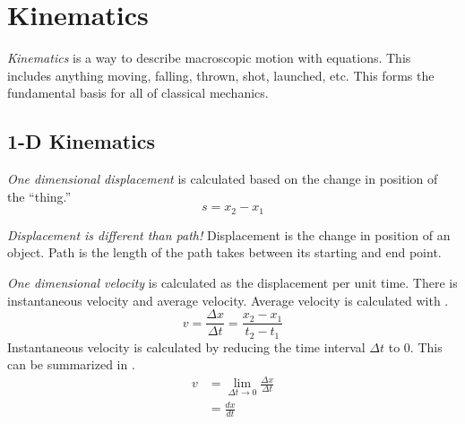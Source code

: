 \section{Kinematics}\label{sec:Kinematics}
\begin{definition}[Kinematics]\label{def:Kinematics}
  \emph{Kinematics} is a way to describe macroscopic motion with equations.
  This includes anything moving, falling, thrown, shot, launched, etc.
  This forms the fundamental basis for all of classical mechanics.
\end{definition}

\subsection{1-D Kinematics}\label{subsec:1-D Kinematics}
\begin{definition}[1-D Displacement]\label{def:1-D Displacement}
  \emph{One dimensional displacement} is calculated based on the change in position of the ``thing.''
  \begin{equation}\label{eq:1-D Displacement}
    s = x_{2} - x_{1}
  \end{equation}
  \begin{remark}
    \emph{Displacement is different than path!}
    Displacement is the change in position of an object.
    Path is the length of the path takes between its starting and end point.
  \end{remark}
\end{definition}

\begin{definition}[1-D Velocity]\label{def:1-D Velocity}
  \emph{One dimensional velocity} is calculated as the displacement per unit time.
  There is instantaneous velocity and average velocity.
  Average velocity is calculated with .
  \begin{equation}\label{eq:1-D Average Velocity}
    v = \frac{\Delta x}{\Delta t} = \frac{x_{2}-x_{1}}{t_{2}-t_{1}}
  \end{equation}
  Instantaneous velocity is calculated by reducing the time interval $\Delta t$ to 0.
  This can be summarized in .
  \begin{equation}\label{eq:1-D Instantaneous Velocity}
    \begin{aligned}
      v &= \lim\limits_{\Delta t \to 0} \frac{\Delta x}{\Delta t} \\
      &= \frac{dx}{dt}
    \end{aligned}
  \end{equation}
\end{definition}

